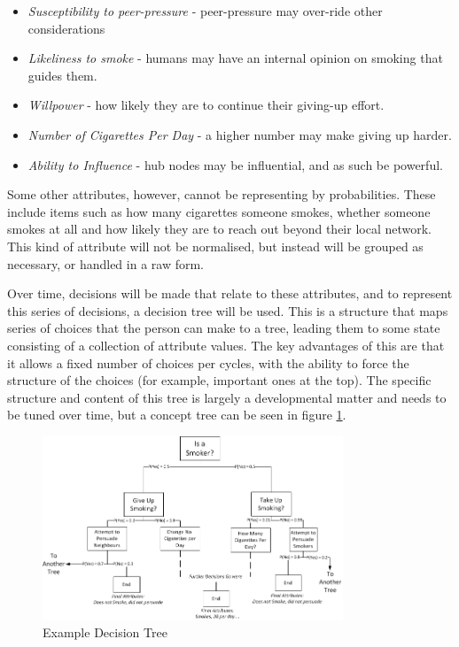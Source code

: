 \documentclass[]{article}
\begin{document}
\begin{itemize}
\item \emph{Susceptibility to peer-pressure} - peer-pressure may over-ride other considerations
\item \emph{Likeliness to smoke} - humans may have an internal opinion on smoking that guides them.
\item \emph{Willpower} - how likely they are to continue their giving-up effort.
\item \emph{Number of Cigarettes Per Day} - a higher number may make giving up harder.
\item \emph{Ability to Influence} - hub nodes may be influential, and as such be powerful.
\end{itemize}

Some other attributes, however, cannot be representing by probabilities. These include items such as how many cigarettes someone smokes, whether someone smokes at all and how likely they are to reach out beyond their local network. This kind of attribute will not be normalised, but instead will be grouped as necessary, or handled in a raw form. 

Over time, decisions will be made that relate to these attributes, and to represent this series of decisions, a decision tree will be used. This is a structure that maps series of choices that the person can make to a tree, leading them to some state consisting of a collection of attribute values. The key advantages of this are that it allows a fixed number of choices per cycles, with the ability to force the structure of the choices (for example, important ones at the top). The specific structure and content of this tree is largely a developmental matter and needs to be tuned over time, but a concept tree can be seen in figure \ref{fig:Sample decision tree}.


\begin{figure}
	\centering
		\includegraphics[width=0.80\textwidth]{sdt.jpg}
	\caption{Example Decision Tree}
	\label{fig:Sample decision tree}
\end{figure}
\end{document}
